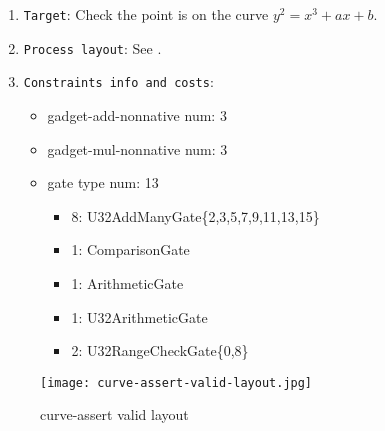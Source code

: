 
\begin{enumerate}
    \item \verb|Target|: Check the point is on the curve $y^2 = x^3 + ax + b$.
    \item \verb|Process layout|: See .
    \item \verb|Constraints info and costs|:
    \begin{itemize}
        \item gadget-add-nonnative num: 3
        \item gadget-mul-nonnative num: 3
        \item gate type num: 13
            \begin{itemize}
                \item 8: U32AddManyGate\{2,3,5,7,9,11,13,15\}
                \item 1: ComparisonGate
                \item 1: ArithmeticGate
                \item 1: U32ArithmeticGate
                \item 2: U32RangeCheckGate\{0,8\}
            \end{itemize}
    \end{itemize}
\end{enumerate}

\begin{figure}[!ht]
    \centering
    \texttt{[image: curve-assert-valid-layout.jpg]}
    \caption{curve-assert valid layout}
    \label{fig:curve-assert-valid-layout}
\end{figure}

